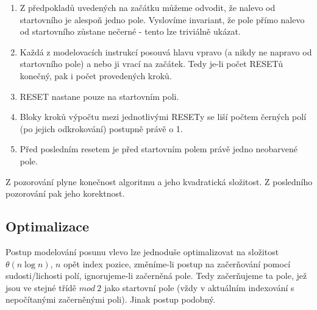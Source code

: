 \documentclass[a4paper,12pt]{article} %
\begin{document}
\begin{enumerate}
    \item Z předpokladů uvedených na začátku můžeme odvodit, že nalevo od startovního je alespoň jedno pole. Vyslovíme invariant, že pole přímo nalevo od startovního zůstane nečerné - tento lze triviálně ukázat.
    
    \item Každá z modelovacích instrukcí posouvá hlavu vpravo (a nikdy ne napravo od startovního pole) a nebo ji vrací na začátek. Tedy je-li počet RESETů konečný, pak i počet provedených kroků.
    
    \item RESET nastane pouze na startovním poli.
    
    \item Bloky kroků výpočtu mezi jednotlivými RESETy se liší počtem černých polí (po jejich odkrokování) postupně právě o 1.
    
    \item Před posledním resetem je před startovním polem právě jedno neobarvené pole.
\end{enumerate}

Z pozorování plyne konečnost algoritmu a jeho kvadratická složitost. Z posledního pozorování pak jeho korektnost.

\subsection*{Optimalizace}

Postup modelování posunu vlevo lze jednoduše optimalizovat na složitost $\theta(n \log n)$, $n$ opět index pozice, změníme-li postup na začerňování pomocí sudosti/lichosti polí, ignorujeme-li začerněná pole. Tedy začerňujeme ta pole, jež jsou ve stejné třídě $mod\ 2$ jako startovní pole (vždy v aktuálním indexování s nepočítanými začerněnými poli). Jinak postup podobný.
\end{document}
